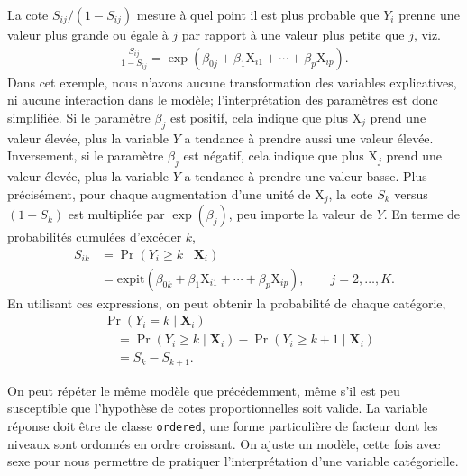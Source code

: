 \documentclass[
  11pt,
  letterpaper,
]{book}
\theoremstyle{definition}
\theoremstyle{remark}
\begin{document}
La cote \(S_{ij}/(1-S_{ij})\) mesure à quel point il est plus probable
que \(Y_i\) prenne une valeur plus grande ou égale à \(j\) par rapport à
une valeur plus petite que \(j\), viz. \begin{align*}
\frac{S_{ij}}{1-S_{ij}} = \exp( \beta_{0j} + \beta_1\mathrm{X}_{i1} + \cdots + \beta_p \mathrm{X}_{ip}).
\end{align*} Dans cet exemple, nous n'avons aucune transformation des
variables explicatives, ni aucune interaction dans le modèle;
l'interprétation des paramètres est donc simplifiée. Si le paramètre
\(\beta_j\) est positif, cela indique que plus \(\mathrm{X}_j\) prend
une valeur élevée, plus la variable \(Y\) a tendance à prendre aussi une
valeur élevée. Inversement, si le paramètre \(\beta_j\) est négatif,
cela indique que plus \(\mathrm{X}_j\) prend une valeur élevée, plus la
variable \(Y\) a tendance à prendre une valeur basse. Plus précisément,
pour chaque augmentation d'une unité de \(\mathrm{X}_j\), la cote
\(S_k\) versus \((1-S_k)\) est multipliée par \(\exp(\beta_j)\), peu
importe la valeur de \(Y\). En terme de probabilités cumulées d'excéder
\(k\), \begin{align*}
S_{ik} &= \Pr(Y_i \geq k \mid \mathbf{X}_{i}) 
\\& = \textrm{expit}(\beta_{0k} + \beta_1 \mathrm{X}_{i1} + \cdots + \beta_p \mathrm{X}_{ip}), \qquad j =2, \ldots, K.
\end{align*} En utilisant ces expressions, on peut obtenir la
probabilité de chaque catégorie, \begin{align*}
&\Pr(Y_i = k \mid \mathbf{X}_{i}) \\&\quad=\Pr(Y_i \geq k \mid \mathbf{X}_{i}) -\Pr(Y_i \geq k+1 \mid \mathbf{X}_{i}) \\&\quad= S_{k} - S_{k+1}.
\end{align*}

On peut répéter le même modèle que précédemment, même s'il est peu
susceptible que l'hypothèse de cotes proportionnelles soit valide. La
variable réponse doit être de classe \texttt{ordered}, une forme
particulière de facteur dont les niveaux sont ordonnés en ordre
croissant. On ajuste un modèle, cette fois avec sexe pour nous permettre
de pratiquer l'interprétation d'une variable catégorielle.
\end{document}
